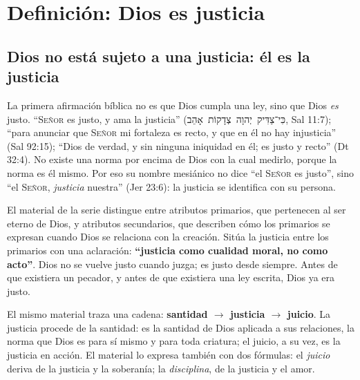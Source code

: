 \documentclass[11pt,letterpaper]{article}
\newcommand{\heb}[1]{\mbox{\foreignlanguage{hebrew}{#1}}}
\newcommand{\SENOR}{\textsc{Señor}}
\newcommand{\destacar}[1]{\textbf{\textcolor{azul}{#1}}}
\begin{document}
\section{Definición: Dios es justicia}\label{sec:definicion-justo}

\subsection{Dios no está sujeto a una justicia: él es la justicia}
La primera afirmación bíblica no es que Dios cumpla una ley, sino que Dios \emph{es} justo. ``\SENOR{} es justo, y ama la justicia'' (\heb{כִּי־צַדִּיק יְהוָה צְדָקוֹת אָהֵב}, Sal 11:7); ``para anunciar que \SENOR{} mi fortaleza es recto, y que en él no hay injusticia'' (Sal 92:15); ``Dios de verdad, y sin ninguna iniquidad en él; es justo y recto'' (Dt 32:4). No existe una norma por encima de Dios con la cual medirlo, porque la norma es él mismo. Por eso su nombre mesiánico no dice ``el \SENOR{} es justo'', sino ``el \SENOR, \emph{justicia} nuestra'' (Jer 23:6): la justicia se identifica con su persona.

El material de la serie distingue entre atributos primarios, que pertenecen al ser eterno de Dios, y atributos secundarios, que describen cómo los primarios se expresan cuando Dios se relaciona con la creación. Sitúa la justicia entre los primarios con una aclaración: \destacar{``justicia como cualidad moral, no como acto''}. Dios no se vuelve justo cuando juzga; es justo desde siempre. Antes de que existiera un pecador, y antes de que existiera una ley escrita, Dios ya era justo.

El mismo material traza una cadena: \destacar{santidad $\rightarrow$ justicia $\rightarrow$ juicio}. La justicia procede de la santidad: es la santidad de Dios aplicada a sus relaciones, la norma que Dios es para sí mismo y para toda criatura; el juicio, a su vez, es la justicia en acción. El material lo expresa también con dos fórmulas: el \emph{juicio} deriva de la justicia y la soberanía; la \emph{disciplina}, de la justicia y el amor.
\end{document}
